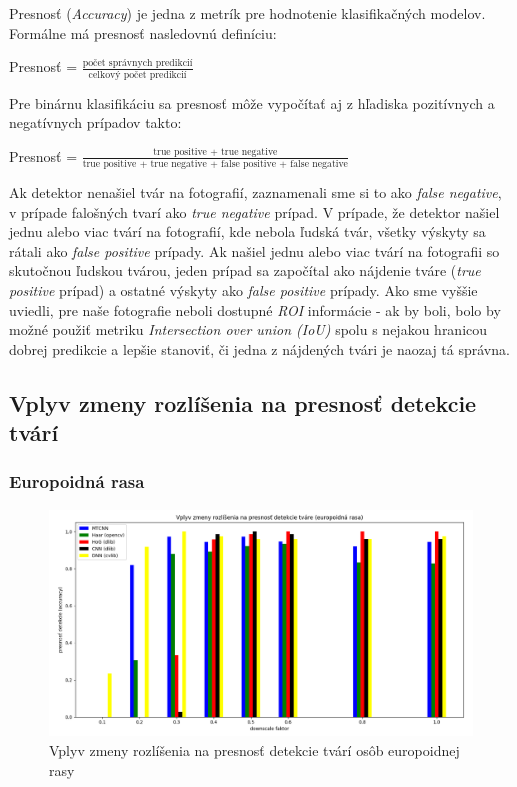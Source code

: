 \documentclass[]{article}
\newcommand*\textfrac[2]{
	\frac{\text{#1}}{\text{#2}}
}
\begin{document}
	Presnosť (\textit{Accuracy}) je jedna z metrík pre hodnotenie klasifikačných modelov. Formálne má presnosť nasledovnú definíciu:
	\begin{center}
		Presnosť = $\textfrac{počet správnych predikcií}{celkový počet predikcií}$
	\end{center}
	Pre binárnu klasifikáciu sa presnosť môže vypočítať aj z hľadiska pozitívnych a negatívnych prípadov takto:
	\begin{center}
		Presnosť = $\textfrac{true positive + true negative}{true positive + true negative + false positive + false negative}$
	\end{center}
	Ak detektor nenašiel tvár na fotografií, zaznamenali sme si to ako \textit{false negative}, v prípade falošných tvarí ako \textit{true negative} prípad. V prípade, že detektor našiel jednu alebo viac tvárí na fotografií, kde nebola ľudská tvár, všetky výskyty sa rátali ako \textit{false positive} prípady. Ak našiel jednu alebo viac tvárí na fotografii so skutočnou ľudskou tvárou, jeden prípad sa započítal ako nájdenie tváre (\textit{true positive} prípad) a ostatné výskyty ako \textit{false positive} prípady. Ako sme vyššie uviedli, pre naše fotografie neboli dostupné \textit{ROI} informácie \-- ak by boli, bolo by možné použiť metriku \textit{Intersection over union (IoU)} spolu s nejakou hranicou dobrej predikcie a lepšie stanoviť, či jedna z nájdených tvári je naozaj tá správna.
	
	
	\subsection*{Vplyv zmeny rozlíšenia na presnosť detekcie tvárí}
	
	\subsubsection*{Europoidná rasa}
	
	\begin{figure}[h!]
		\includegraphics[height=6cm, width=\textwidth]{Vysledky_rozslisenie/europ/Figure_1.png}
		\caption{Vplyv zmeny rozlíšenia na presnosť detekcie tvárí osôb europoidnej rasy}
	\end{figure}
\end{document}
